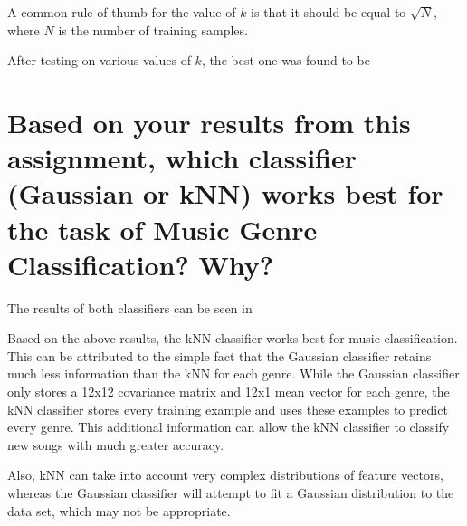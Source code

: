 \documentclass[a4paper,titlepage]{article}
\begin{document}
	A common rule-of-thumb for the value of $k$ is that it should be equal to $\sqrt{N}$, where $N$ is the number of training samples. %
	
	After testing on various values of $k$, the best one was found to be %
	
	\section{Based on your results from this assignment, which classifier (Gaussian or kNN) works best for the task of Music Genre Classification? Why?}
	
	The results of both classifiers can be seen in %
	
	Based on the above results, the kNN classifier works best for music classification. This can be attributed to the simple fact that the Gaussian classifier retains much less information than the kNN for each genre. While the Gaussian classifier only stores a 12x12 covariance matrix and 12x1 mean vector for each genre, the kNN classifier stores every training example and uses these examples to predict every genre. This additional information can allow the kNN classifier to classify new songs with much greater accuracy. 
	
	Also, kNN can take into account very complex distributions of feature vectors, whereas the Gaussian classifier will attempt to fit a Gaussian distribution to the data set, which may not be appropriate.
	
	
	
\end{document}
